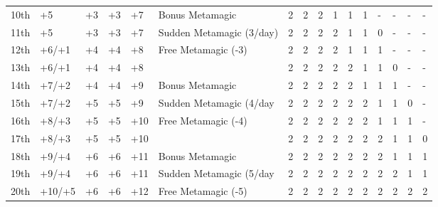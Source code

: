 \begin{table}[htb]
\begin{small}
\begin{tabular}{lp{1.2cm}p{0.7cm}p{0.7cm}p{0.7cm}p{4.7cm}llllllllll}
10th   &+5                 &+3        &+3       &+7        & Bonus Metamagic         &2 &2 &2 &1 &1 &1 &- &- &- &- \\
11th   &+5                 &+3        &+3       &+7        & Sudden Metamagic (3/day)&2 &2 &2 &2 &1 &1 &0 &- &- &- \\
12th   &+6/+1              &+4        &+4       &+8        & Free Metamagic (-3)     &2 &2 &2 &2 &1 &1 &1 &- &- &- \\
13th   &+6/+1              &+4        &+4       &+8        &                         &2 &2 &2 &2 &2 &1 &1 &0 &- &- \\
14th   &+7/+2              &+4        &+4       &+9        & Bonus Metamagic         &2 &2 &2 &2 &2 &1 &1 &1 &- &- \\
15th   &+7/+2              &+5        &+5       &+9        & Sudden Metamagic (4/day &2 &2 &2 &2 &2 &2 &1 &1 &0 &- \\
16th   &+8/+3              &+5        &+5       &+10       & Free Metamagic (-4)     &2 &2 &2 &2 &2 &2 &1 &1 &1 &- \\
17th   &+8/+3              &+5        &+5       &+10       &                         &2 &2 &2 &2 &2 &2 &2 &1 &1 &0 \\
18th   &+9/+4              &+6        &+6       &+11       & Bonus Metamagic         &2 &2 &2 &2 &2 &2 &2 &1 &1 &1 \\
19th   &+9/+4              &+6        &+6       &+11       & Sudden Metamagic (5/day &2 &2 &2 &2 &2 &2 &2 &2 &1 &1 \\
20th   &+10/+5             &+6        &+6       &+12       & Free Metamagic (-5)     &2 &2 &2 &2 &2 &2 &2 &2 &2 &2 \\
\end{tabular}
\end{small}
\end{table}  
 


